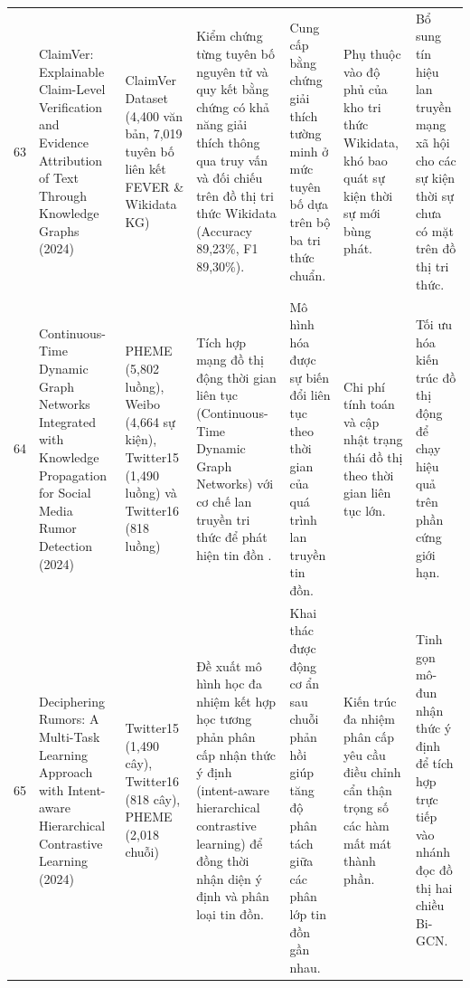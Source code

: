 \documentclass[11pt,a4paper]{extreport}
\begin{document}
\begin{landscape}
\begin{longtable}{@{}C{0.6cm}p{3.6cm}p{2.7cm}p{4.8cm}p{3.6cm}p{3.6cm}p{3.6cm}@{}}
63 & ClaimVer: Explainable Claim-Level Verification and Evidence Attribution of Text Through Knowledge Graphs (2024) \cite{noauthor_claimver_2024} & ClaimVer Dataset (4,400 văn bản, 7,019 tuyên bố liên kết FEVER \& Wikidata KG) & Kiểm chứng từng tuyên bố nguyên tử và quy kết bằng chứng có khả năng giải thích thông qua truy vấn và đối chiếu trên đồ thị tri thức Wikidata (Accuracy 89,23\%, F1 89,30\%). & Cung cấp bằng chứng giải thích tường minh ở mức tuyên bố dựa trên bộ ba tri thức chuẩn. & Phụ thuộc vào độ phủ của kho tri thức Wikidata, khó bao quát sự kiện thời sự mới bùng phát. & Bổ sung tín hiệu lan truyền mạng xã hội cho các sự kiện thời sự chưa có mặt trên đồ thị tri thức. \\ 

64 & Continuous-Time Dynamic Graph Networks Integrated with Knowledge Propagation for Social Media Rumor Detection (2024) \cite{noauthor_continuous-time_2024} & PHEME (5,802 luồng), Weibo (4,664 sự kiện), Twitter15 (1,490 luồng) và Twitter16 (818 luồng) & Tích hợp mạng đồ thị động thời gian liên tục (Continuous-Time Dynamic Graph Networks) với cơ chế lan truyền tri thức để phát hiện tin đồn \cite{noauthor_continuous-time_2024}. & Mô hình hóa được sự biến đổi liên tục theo thời gian của quá trình lan truyền tin đồn. & Chi phí tính toán và cập nhật trạng thái đồ thị theo thời gian liên tục lớn. & Tối ưu hóa kiến trúc đồ thị động để chạy hiệu quả trên phần cứng giới hạn. \\ 

65 & Deciphering Rumors: A Multi-Task Learning Approach with Intent-aware Hierarchical Contrastive Learning (2024) \cite{noauthor_deciphering_2024} & Twitter15 (1,490 cây), Twitter16 (818 cây), PHEME (2,018 chuỗi) & Đề xuất mô hình học đa nhiệm kết hợp học tương phản phân cấp nhận thức ý định (intent-aware hierarchical contrastive learning) để đồng thời nhận diện ý định và phân loại tin đồn. & Khai thác được động cơ ẩn sau chuỗi phản hồi giúp tăng độ phân tách giữa các phân lớp tin đồn gần nhau. & Kiến trúc đa nhiệm phân cấp yêu cầu điều chỉnh cẩn thận trọng số các hàm mất mát thành phần. & Tinh gọn mô-đun nhận thức ý định để tích hợp trực tiếp vào nhánh đọc đồ thị hai chiều Bi-GCN. \\ 


\end{longtable}
\end{landscape}
\end{document}
